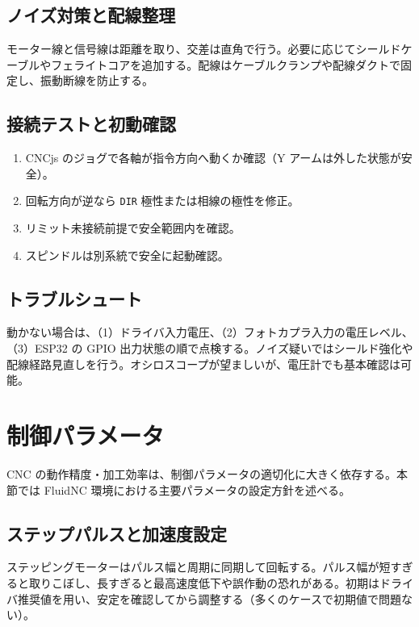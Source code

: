 \documentclass[uplatex,dvipdfmx]{ujarticle}
\begin{document}
\subsection{ノイズ対策と配線整理}

モーター線と信号線は距離を取り、交差は直角で行う。必要に応じてシールドケーブルやフェライトコアを追加する。配線はケーブルクランプや配線ダクトで固定し、振動断線を防止する。

\subsection{接続テストと初動確認}

\begin{enumerate}
  \item CNCjs のジョグで各軸が指令方向へ動くか確認（Y アームは外した状態が安全）。
  \item 回転方向が逆なら \texttt{DIR} 極性または相線の極性を修正。
  \item リミット未接続前提で安全範囲内を確認。
  \item スピンドルは別系統で安全に起動確認。
\end{enumerate}

\subsection{トラブルシュート}

動かない場合は、（1）ドライバ入力電圧、（2）フォトカプラ入力の電圧レベル、（3）ESP32 の GPIO 出力状態の順で点検する。ノイズ疑いではシールド強化や配線経路見直しを行う。オシロスコープが望ましいが、電圧計でも基本確認は可能。

\section{制御パラメータ}

CNC の動作精度・加工効率は、制御パラメータの適切化に大きく依存する。本節では FluidNC 環境における主要パラメータの設定方針を述べる。

\subsection{ステップパルスと加速度設定}

ステッピングモーターはパルス幅と周期に同期して回転する。パルス幅が短すぎると取りこぼし、長すぎると最高速度低下や誤作動の恐れがある。初期はドライバ推奨値を用い、安定を確認してから調整する（多くのケースで初期値で問題ない）。
\end{document}

